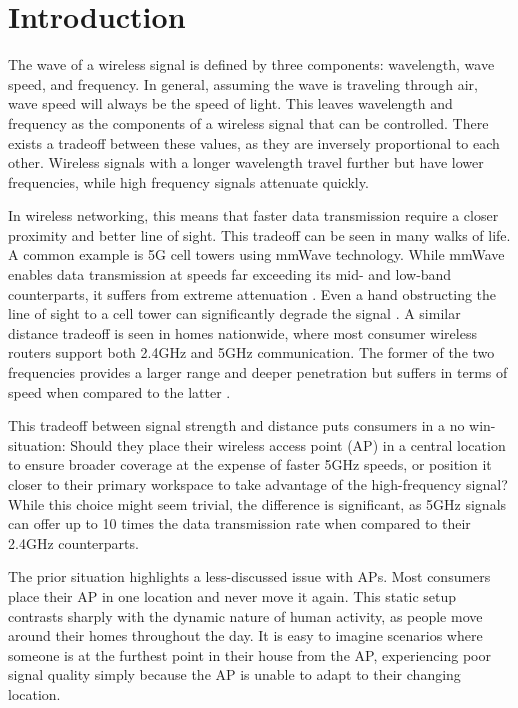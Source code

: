
\section{Introduction}

The wave of a wireless signal is defined by three components: wavelength, wave speed, and frequency. In general, assuming the wave is traveling through air, wave speed will always be the speed of light. This leaves wavelength and frequency as the components of a wireless signal that can be controlled. There exists a tradeoff between these values, as they are inversely proportional to each other. Wireless signals with a longer wavelength travel further but have lower frequencies, while high frequency signals attenuate quickly.

  

In wireless networking, this means that faster data transmission require a closer proximity and better line of sight. This tradeoff can be seen in many walks of life. A common example is 5G cell towers using mmWave technology. While mmWave enables data transmission at speeds far exceeding its mid- and low-band counterparts, it suffers from extreme attenuation \cite{mmWaveSurvey}. Even a hand obstructing the line of sight to a cell tower can significantly degrade the signal \cite{handBlock}. A similar distance tradeoff is seen in homes nationwide, where most consumer wireless routers support both 2.4GHz and 5GHz communication. The former of the two frequencies provides a larger range and deeper penetration but suffers in terms of speed when compared to the latter \cite{wirelessPenetration}.

  

This tradeoff between signal strength and distance puts consumers in a no win-situation: Should they place their wireless access point (AP) in a central location to ensure broader coverage at the expense of faster 5GHz speeds, or position it closer to their primary workspace to take advantage of the high-frequency signal? While this choice might seem trivial, the difference is significant, as 5GHz signals can offer up to 10 times the data transmission rate when compared to their 2.4GHz counterparts.

  

The prior situation highlights a less-discussed issue with APs. Most consumers place their AP in one location and never move it again. This static setup contrasts sharply with the dynamic nature of human activity, as people move around their homes throughout the day. It is easy to imagine scenarios where someone is at the furthest point in their house from the AP, experiencing poor signal quality simply because the AP is unable to adapt to their changing location.

